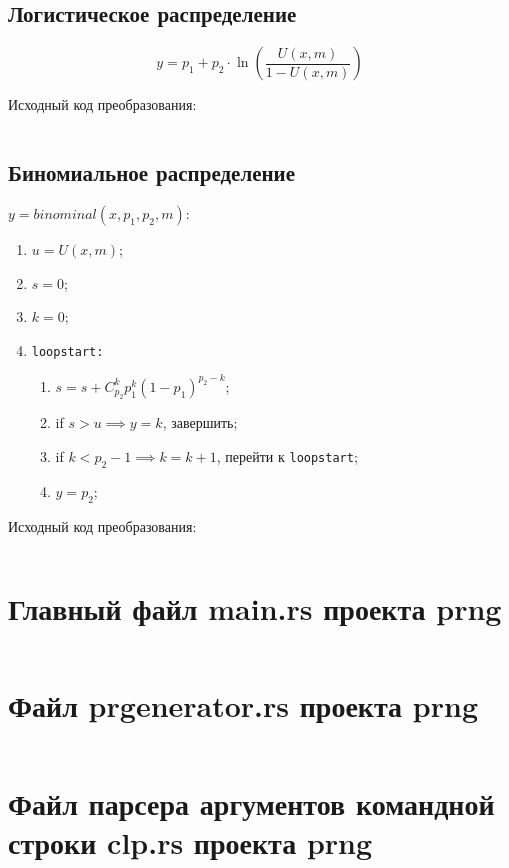 \documentclass[spec, och, pract_otchet]{SCWorks}
\begin{document}
\subsection{Логистическое распределение}

\begin{equation*}
  y = p_1 + p_2 \cdot \ln\left(\frac{U(x, m)}{1 - U(x, m)}\right)
\end{equation*}

Исходный код преобразования:
\inputminted{rust}{../rnc/src/logistic.rs}


\subsection{Биномиальное распределение}

$y = binominal(x, p_1, p_2, m):$
\begin{enumerate}
  \item $u = U(x, m)$;
  \item $s = 0$;
  \item $k = 0$;
  \item
    \texttt{loopstart:}
    \begin{enumerate}
      \item $s = s + C_{p_2}^k p_1^k (1 - p_1)^{p_2 - k}$;
      \item if $s > u \implies y = k$, завершить;
      \item if $k < p_2 - 1 \implies k = k + 1$, перейти к \texttt{loopstart};
      \item $y = p_2$;
    \end{enumerate}
\end{enumerate}

Исходный код преобразования:
\inputminted{rust}{../rnc/src/binomial.rs}

\appendix

\section{Главный файл main.rs проекта prng}
\inputminted{rust}{../prng/src/main.rs}

\section{Файл prgenerator.rs проекта prng}
\inputminted{rust}{../prng/src/prgenerator.rs}

\section{Файл парсера аргументов командной строки clp.rs проекта prng}
\inputminted{rust}{../prng/src/clp.rs}
\end{document}
